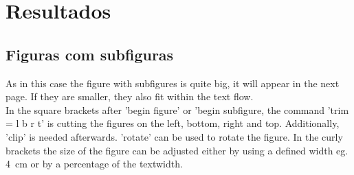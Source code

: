 \clearpage

\chapter{\textbf{Resultados}}\label{results}
\section{Figuras com subfiguras}\label{res:subfigure}
As in this case the figure with subfigures is quite big, it will appear in the next page. If they are smaller, they also fit within the text flow.\\
In the square brackets after 'begin figure' or 'begin subfigure, the command 'trim = l b r t' is cutting the figures on the left, bottom, right and top. Additionally, 'clip' is needed afterwards. 'rotate' can be used to rotate the figure. In the curly brackets the size of the figure can be adjusted either by using a defined width eg. 4~cm or by a percentage of the textwidth.
